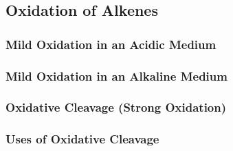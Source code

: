 


\subsection{Oxidation of Alkenes}

	\subsubsection{Mild Oxidation in an Acidic Medium}

	\subsubsection{Mild Oxidation in an Alkaline Medium}

	\subsubsection{Oxidative Cleavage (Strong Oxidation)}

	\subsubsection{Uses of Oxidative Cleavage}

































